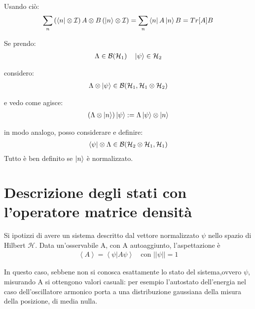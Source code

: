 Usando ciò:
\begin{gather}
\sum_n \left ( \bra{n} \otimes \mathcal{I} \right) A \otimes B \left( \ket{n} \otimes \mathcal{I} \right) = \sum_n \bra{n}A\ket{n}B = Tr[A]B
\end{gather}

Se prendo:
\begin{gather}
\Lambda \in \mathcal{B}({\mathcal{H}}_1) \quad \ket{\psi} \in {\mathcal{H}}_2 
\end{gather}

considero: 
\begin{gather}
\Lambda \otimes \ket{\psi} \in \mathcal{B}({\mathcal{H}}_1,{\mathcal{H}}_1 \otimes {\mathcal{H}}_2 ) \nonumber 
\end{gather}

e vedo come agisce: 
\begin{gather}
(\Lambda \otimes \ket{n}) \ket{\psi} := \Lambda  \ket{\psi} \otimes \ket{n} 
\end{gather}

in modo analogo, posso considerare e definire: 
\begin{gather}
\bra{\psi} \otimes \Lambda \in \mathcal{B}({\mathcal{H}}_2   \otimes {\mathcal{H}}_1,{\mathcal{H}}_1 ) 
\end{gather}
Tutto è ben definito se $\ket{n}$ è normalizzato.


%

\chapter[Stati con la matrice densità]{Descrizione degli stati con l'operatore matrice densità} %

Si ipotizzi di avere un sistema descritto dal vettore normalizzato $\psi$ nello spazio di Hilbert $\mathcal{H}$. Data un'osservabile A, con A autoaggiunto, l'aspettazione è 
\begin{equation}\begin{split}
\left\langle A \right\rangle=\left\langle \psi |A\psi  \right\rangle \quad \text{con $||\psi || = 1$}
\end{split}\end{equation}

In questo caso, sebbene non si conosca esattamente lo stato del sistema,ovvero $\psi$, misurando A si ottengono valori casuali: per esempio l'autostato dell'energia nel caso dell'oscillatore armonico porta a una distribuzione gaussiana della misura della posizione, di media nulla.

